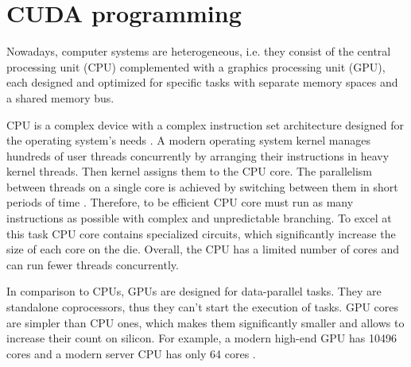 \chapter{CUDA programming}


Nowadays, computer systems are heterogeneous, i.e. they consist of the central processing unit (CPU) complemented with a graphics processing unit (GPU), each designed and optimized for specific tasks with separate memory spaces and a shared memory bus.

CPU is a complex device with a complex instruction set architecture designed for the operating system's needs \cite{ComputerArchitecture2011}.
A modern operating system kernel manages hundreds of user threads concurrently by arranging their instructions in heavy kernel threads.
Then kernel assigns them to the CPU core.
The parallelism between threads on a single core is achieved by switching between them in short periods of time \cite{ModernOperatingSystems2014}.
Therefore, to be efficient CPU core must run as many instructions as possible with complex and unpredictable branching.
To excel at this task CPU core contains specialized circuits, which significantly increase the size of each core on the die.
Overall, the CPU has a limited number of cores and can run fewer threads concurrently.

In comparison to CPUs, GPUs are designed for data-parallel tasks.
They are standalone coprocessors, thus they can’t start the execution of tasks.
GPU cores are simpler than CPU ones, which makes them significantly smaller and allows to increase their count on silicon.
For example, a modern high-end GPU has 10496 cores \cite{AmpereNVIDIA} and a modern server CPU has only 64 cores \cite{AMDThreadripper}.

